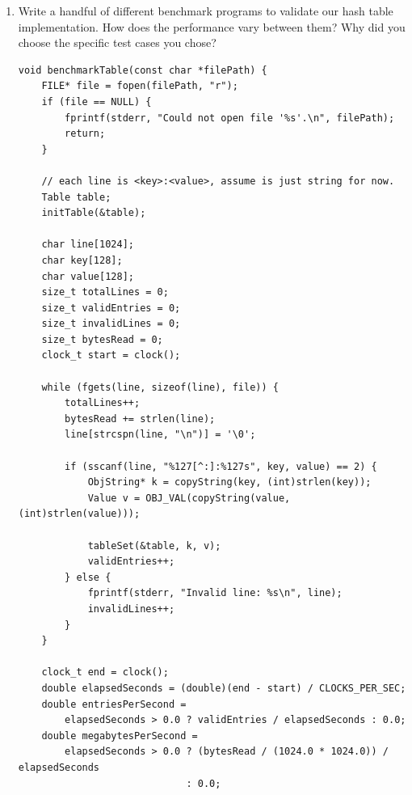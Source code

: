 \documentclass{article}
\begin{document}
\begin{enumerate}
{        Here is the key implementation difference: probing is done with larger 
        steps. Specifically, each "probe", we jump by 1 chunk, then 2, then 3.
        This leaves larger gaps in our table, which is good, since it increases
        uniformity of the distribution of hashed values. Also, this is still guaranteed 
        to terminate if there is an empty bucket for some mathematical reason.

        This is the main design choice differnce, and it is pretty interesting.
        There are some other minute details and edge cases to take care of, but
        this is the crux of the implementation.
    }

    \item {
        Write a handful of different benchmark programs to validate our hash table implementation. How does the performance vary between them? Why did you choose the specific test cases you chose?

        \begin{verbatim}
void benchmarkTable(const char *filePath) {
    FILE* file = fopen(filePath, "r");
    if (file == NULL) {
        fprintf(stderr, "Could not open file '%s'.\n", filePath);
        return;
    }

    // each line is <key>:<value>, assume is just string for now.
    Table table;
    initTable(&table);

    char line[1024];
    char key[128];
    char value[128];
    size_t totalLines = 0;
    size_t validEntries = 0;
    size_t invalidLines = 0;
    size_t bytesRead = 0;
    clock_t start = clock();
    
    while (fgets(line, sizeof(line), file)) {
        totalLines++;
        bytesRead += strlen(line);
        line[strcspn(line, "\n")] = '\0';
        
        if (sscanf(line, "%127[^:]:%127s", key, value) == 2) {
            ObjString* k = copyString(key, (int)strlen(key));
            Value v = OBJ_VAL(copyString(value, (int)strlen(value)));

            tableSet(&table, k, v);
            validEntries++;
        } else {
            fprintf(stderr, "Invalid line: %s\n", line);
            invalidLines++;
        }
    }

    clock_t end = clock();
    double elapsedSeconds = (double)(end - start) / CLOCKS_PER_SEC;
    double entriesPerSecond =
        elapsedSeconds > 0.0 ? validEntries / elapsedSeconds : 0.0;
    double megabytesPerSecond =
        elapsedSeconds > 0.0 ? (bytesRead / (1024.0 * 1024.0)) / elapsedSeconds
                             : 0.0;


\end{verbatim}}
\end{enumerate}
\end{document}
